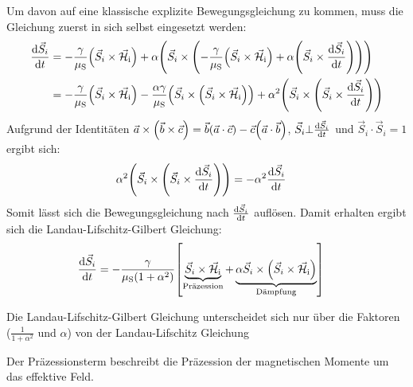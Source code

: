 \documentclass[main.tex]{subfiles}
\begin{document}
Um davon auf eine klassische explizite Bewegungsgleichung zu kommen, muss die
Gleichung zuerst in sich selbst eingesetzt werden:
\begin{align}
	\dv{\vec{S}_i}{t} & = -\frac{\gamma }{\mu_{\text{S}}}\qty(\vec{S}_i
	\times
	\vec{\mathcal{H}}_{\text{i}}) + \alpha \qty(\vec{S}_i \times
	\qty(-\frac{\gamma }{\mu_{\text{S}}}\qty(\vec{S}_i
		\times
		\vec{\mathcal{H}}_{\text{i}}) + \alpha \qty(\vec{S}_i \times
	\dv{\vec{S}_i}{t})))                                                \\
	                  & = -\frac{\gamma }{\mu_{\text{S}}}\qty(\vec{S}_i
	\times
	\vec{\mathcal{H}}_{\text{i}}) - \frac{\alpha\gamma}{\mu_\text{S}}
	\qty(\vec{S}_i \times \qty(\vec{S}_i \times
		\vec{\mathcal{H}}_{\text{i}})) +
	\alpha^2 \qty(\vec{S}_i \times \qty(\vec{S}_i \times
		\dv{\vec{S}_i}{t}))
\end{align}
Aufgrund der Identitäten \(\vec{a} \times \qty(\vec{b} \times \vec{c}) =
\vec{b} \qty(\vec{a} \cdot \vec{c}) - \vec{c} \qty(\vec{a} \cdot \vec{b})\),
\(\vec{S}_i \bot \dv{\vec{S}_i}{t}\) und \(\vec{S}_i \cdot \vec{S}_i = 1\)
ergibt sich:
\begin{align}
	\alpha^2 \qty(\vec{S}_i \times \qty(\vec{S}_i \times
	\dv{\vec{S}_i}{t})) & = -\alpha^2\dv{\vec{S}_i}{t}
\end{align}
Somit lässt sich die Bewegungsgleichung nach \(\dv{\vec{S}_i}{t}\) auflösen.
Damit erhalten ergibt sich die Landau-Lifschitz-Gilbert Gleichung:
\begin{align}
	\dv{\vec{S}_i}{t} & = -\frac{\gamma
	}{\mu_{\text{S}}(1+\alpha^2)}\qty[\underbrace{\vec{S}_i \times
			\vec{\mathcal{H}}_{\text{i}}}_\text{Präzession} +
		\underbrace{\alpha \vec{S}_i
			\times 
			\qty(\vec{S}_i \times
			\vec{\mathcal{H}}_{\text{i}})}_\text{Dämpfung}]\label{eq:llg}
\end{align}

Die Landau-Lifschitz-Gilbert Gleichung unterscheidet sich nur über die Faktoren
(\(\frac{1
}{1 + \alpha^2}\) und \(\alpha\)) von der Landau-Lifschitz Gleichung

Der Präzessionsterm beschreibt die Präzession der magnetischen Momente um das
effektive Feld.
\end{document}
